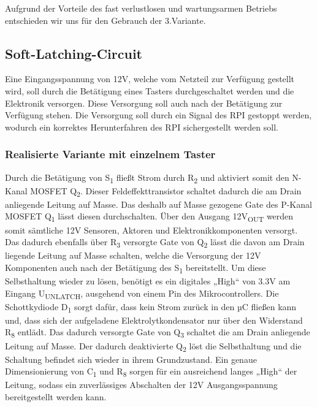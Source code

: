 Aufgrund der Vorteile des fast verlustlosen und wartungsarmen Betriebs entschieden wir uns für den Gebrauch der 3.Variante.

\newpage

\subsection{Soft-Latching-Circuit}

Eine Eingangsspannung von 12V, welche vom Netzteil zur Verfügung gestellt wird, soll durch die Betätigung eines Tasters durchgeschaltet werden und die Elektronik versorgen.
Diese Versorgung soll auch nach der Betätigung zur Verfügung stehen.
Die Versorgung soll durch ein Signal des RPI gestoppt werden, wodurch ein korrektes Herunterfahren des \acs{RPI} sichergestellt werden soll.

\subsubsection{Realisierte Variante mit einzelnem Taster}

Durch die Betätigung von S\textsubscript{1} fließt Strom durch R\textsubscript{2} und aktiviert somit den N-Kanal MOSFET Q\textsubscript{2}.
Dieser Feldeffekttransistor schaltet dadurch die am Drain anliegende Leitung auf Masse.
Das deshalb auf Masse gezogene Gate des P-Kanal MOSFET Q\textsubscript{1} lässt diesen durchschalten.
Über den Ausgang 12V\textsubscript{OUT} werden somit sämtliche 12V Sensoren, Aktoren und Elektronikkomponenten versorgt.
Das dadurch ebenfalls über R\textsubscript{3} versorgte Gate von Q\textsubscript{2} lässt die davon am Drain liegende Leitung auf Masse schalten,
welche die Versorgung der 12V Komponenten auch nach der Betätigung des S\textsubscript{1} bereitstellt.
Um diese Selbsthaltung wieder zu lösen, benötigt es ein digitales „High“ von 3.3V am Eingang U\textsubscript{UNLATCH}, ausgehend von einem Pin des Mikrocontrollers.
Die Schottkydiode D\textsubscript{1} sorgt dafür, dass kein Strom zurück in den µC fließen kann und,
dass sich der aufgeladene Elektrolytkondensator nur über den Widerstand R\textsubscript{8} entlädt.
Das dadurch versorgte Gate von Q\textsubscript{3} schaltet die am Drain anliegende Leitung auf Masse.
Der dadurch deaktivierte Q\textsubscript{2} löst die Selbsthaltung und die Schaltung befindet sich wieder in ihrem Grundzustand.
Ein genaue Dimensionierung von C\textsubscript{1} und R\textsubscript{8} sorgen für ein ausreichend langes „High“ der Leitung,
sodass ein zuverlässiges Abschalten der 12V Ausgangsspannung bereitgestellt werden kann. \\

